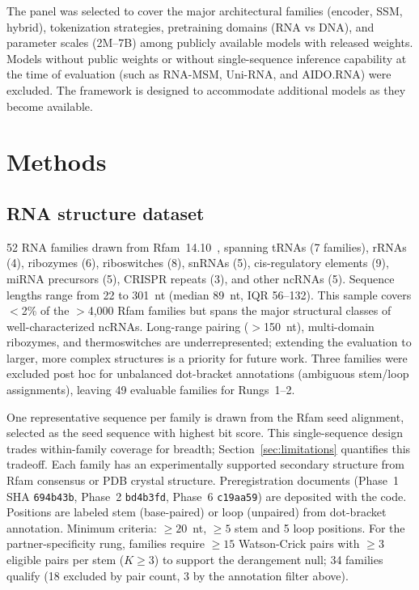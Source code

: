 \documentclass[11pt]{article}
\begin{document}
The panel was selected to cover the major architectural families
(encoder, SSM, hybrid), tokenization strategies, pretraining domains
(RNA vs DNA), and parameter scales (2M--7B) among publicly available
models with released weights. Models without public weights or
without single-sequence inference capability at the time of evaluation
(such as RNA-MSM, Uni-RNA, and AIDO.RNA) were excluded. The framework
is designed to accommodate additional models as they become available.


\section{Methods}

\subsection{RNA structure dataset}

52 RNA families drawn from Rfam~14.10~\citep{rfam2021}, spanning
tRNAs (7 families), rRNAs (4), ribozymes (6), riboswitches (8),
snRNAs (5), cis-regulatory elements (9), miRNA precursors (5),
CRISPR repeats (3), and other ncRNAs (5).
Sequence lengths range from 22 to 301~nt (median 89~nt, IQR 56--132).
This sample covers $<$2\% of the $>$4{,}000 Rfam families but
spans the major structural classes of well-characterized ncRNAs.
Long-range pairing ($>$150~nt), multi-domain ribozymes, and
thermoswitches are underrepresented; extending the evaluation to
larger, more complex structures is a priority for future work.
Three families were excluded post hoc for unbalanced dot-bracket
annotations (ambiguous stem/loop assignments), leaving 49 evaluable
families for Rungs~1--2.

One representative sequence per family is drawn from the Rfam seed
alignment, selected as the seed sequence with highest bit score.
This single-sequence design trades within-family coverage for breadth;
Section~\ref{sec:limitations} quantifies this tradeoff. Each
family has an experimentally supported secondary structure from Rfam
consensus or PDB crystal structure.
Preregistration documents (Phase~1 SHA \texttt{694b43b}, Phase~2
\texttt{bd4b3fd}, Phase~6 \texttt{c19aa59}) are deposited with the
code.
Positions are labeled stem
(base-paired) or loop (unpaired) from dot-bracket annotation.
Minimum criteria: $\geq 20$~nt, $\geq 5$ stem and 5 loop
positions. For the
partner-specificity rung, families require $\geq 15$ Watson-Crick
pairs with $\geq 3$ eligible pairs per stem ($K \geq 3$) to support
the derangement null; 34 families qualify (18 excluded by pair count,
3 by the annotation filter above).
\end{document}
